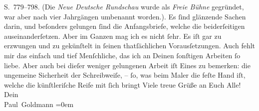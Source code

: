 \begin{ledgroupsized}[t]{13cm}
{{{                     S. 779–798. (Die \emph{Neue Deutsche
                     Rundschau} wurde als \emph{Freie Bühne}
                  gegründet, war aber nach vier Jahrgängen umbenannt worden.)}}}\label{K_L02746-5h}. Es ſind
               glänzende Sachen darin, und beſonders gelungen ſind die Anfangsbriefe, welche die beiderſeitigen
                  \label{K_L02746-6v}\label{K_L02746-6h} auseinanderſetzen. Aber im Ganzen {\pb} mag ich es nicht ſehr. Es iſt gar zu
               erzwungen und zu gekünſtelt in ſeinen thatſächlichen Vorausſetzungen. Auch fehlt mir
               das einfach und tief Menſchliche, das ich an Deinen ſonſtigen Arbeiten ſo liebe. Aber
               auch bei dieſer weniger gelungenen Arbeit iſt Eines zu bemerken: die ungemeine Sicherheit der Schreibweiſe, –
               ſo, was beim Maler die feſte Hand iſt, welche die künſtleriſche Reife mit ſich
                  bringt{\dotstwo}\textcolor{gray}{{\dotstwo}}\pend
           \pstart
           Viele treue Grüße an Euch Alle! {\\[\baselineskip]}Dein {\\[\baselineskip]}\spacefill\mbox{Paul Goldmann}\pend
           \leftskip=0em{}
         
         \endnumbering{}\end{ledgroupsized}  \newcommand{\dateiname}{L02746}\newcommand{\titel}{Paul Goldmann an Arthur Schnitzler, 22. 8. [1895]}\newcommand{\editorInnen}{Martin Anton Müller und Laura Untner}
      